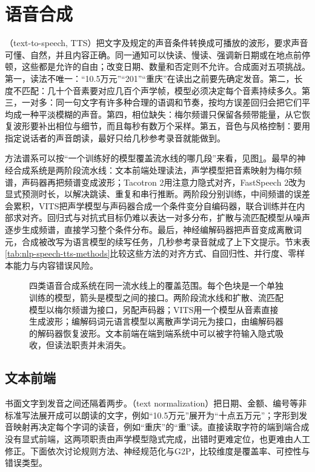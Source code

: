 \section{语音合成}
\label{sec:nlp-speech-tts}

（text-to-speech, TTS）把文字及规定的声音条件转换成可播放的波形，要求声音可懂、自然，并且内容正确。同一通知可以快读、慢读、强调新日期或在地点前停顿，这些都是允许的自由；改变日期、数量和否定则不允许。合成面对五项挑战。第一，读法不唯一：“10.5万元”“201”“重庆”在读出之前要先确定发音。第二，长度不匹配：几十个音素要对应几百个声学帧，模型必须决定每个音素持续多久。第三，一对多：同一句文字有许多种合理的语调和节奏，按均方误差回归会把它们平均成一种平淡模糊的声音。第四，相位缺失：梅尔频谱只保留各频带能量，从它恢复波形要补出相位与细节，而且每秒有数万个采样。第五，音色与风格控制：要用指定说话者的声音朗读，最好只给几秒参考录音就能做到。

方法谱系可以按“一个训练好的模型覆盖流水线的哪几段”来看，见图\ref{fig:nlp-speech-tts-lineage}。最早的神经合成系统是两阶段流水线：文本前端处理读法，声学模型把音素映射为梅尔频谱，声码器再把频谱变成波形；Tacotron 2用注意力隐式对齐，FastSpeech 2改为显式预测时长，以解决跳读、重复和串行推断。两阶段分别训练，中间频谱的误差会累积，VITS把声学模型与声码器合成一个条件变分自编码器，联合训练并在内部求对齐。回归式与对抗式目标仍难以表达一对多分布，扩散与流匹配模型从噪声逐步生成频谱，直接学习整个条件分布。最后，神经编解码器把声音变成离散词元，合成被改写为语言模型的续写任务，几秒参考录音就成了上下文提示。节末表\ref{tab:nlp-speech-tts-methods}比较这些方法的对齐方式、自回归性、并行度、零样本能力与内容错误风险。

\begin{figure}[htbp]
  \centering
  
  \caption{四类语音合成系统在同一流水线上的覆盖范围。每个色块是一个单独训练的模型，箭头是模型之间的接口。两阶段流水线和扩散、流匹配模型以梅尔频谱为接口，另配声码器；VITS用一个模型从音素直接生成波形；编解码词元语言模型以离散声学词元为接口，由编解码器的解码器恢复波形。文本前端在端到端系统中可以被字符输入隐式吸收，但读法职责并未消失。}
  \label{fig:nlp-speech-tts-lineage}
\end{figure}
\FloatBarrier

\subsection{文本前端}
\label{sec:nlp-speech-normalization}

书面文字到发音之间还隔着两步。（text normalization）把日期、金额、编号等非标准写法展开成可以朗读的文字，例如“10.5万元”展开为“十点五万元”；字形到发音映射再决定每个字词的读音，例如“重庆”的“重”读。直接读取字符的端到端合成没有显式前端，这两项职责由声学模型隐式完成，出错时更难定位，也更难由人工修正。下面依次讨论规则方法、神经规范化与G2P，比较维度是覆盖率、可控性与错误类型。

